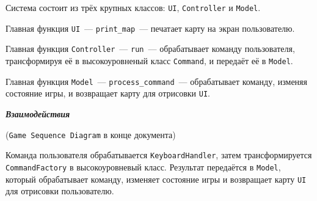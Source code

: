 \documentclass[12pt]{article}
\begin{document}
Система состоит из трёх крупных классов: \texttt{UI}, \texttt{Controller} и \texttt{Model}.

Главная функция \texttt{UI}~--- \texttt{print\_map}~--- печатает карту на экран пользователю.

Главная функция \texttt{Controller}~--- \texttt{run}~--- обрабатывает команду пользователя, трансформируя её в высокоуровненый класс \texttt{Command}, и передаёт её в \texttt{Model}.

Главная функция \texttt{Model}~--- \texttt{process\_command}~--- обрабатывает команду, изменяя состояние игры, и возвращает карту для отрисовки \texttt{UI}.

\begin{center}
\vspace*{0.1cm}
{\Large \textit{\textbf{Взаимодействия}}}

(\texttt{Game Sequence Diagram} в конце документа)
\end{center}

Команда пользователя обрабатывается \texttt{KeyboardHandler}, затем трансформируется \texttt{CommandFactory} в высокоуровневый класс. Результат передаётся в \texttt{Model}, который обрабатывает команду, изменяет состояние игры и возвращает карту \texttt{UI} для отрисовки пользователю.




\end{document}
